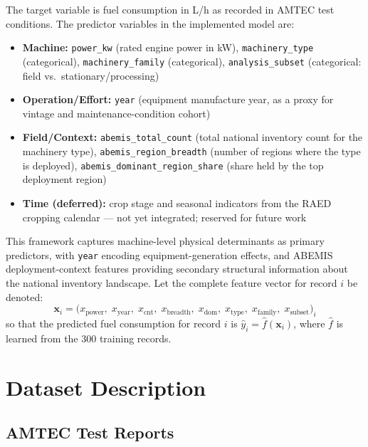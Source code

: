 \documentclass[conference]{IEEEtran}
\begin{document}
The target variable is fuel consumption in L/h as recorded in AMTEC test conditions. The predictor variables in the implemented model are:

\begin{itemize}
  \item \textbf{Machine:} \texttt{power\_kw} (rated engine power in kW), \texttt{machinery\_type} (categorical), \texttt{machinery\_family} (categorical), \texttt{analysis\_subset} (categorical: field vs.\ stationary/processing)
  \item \textbf{Operation/Effort:} \texttt{year} (equipment manufacture year, as a proxy for vintage and maintenance-condition cohort)
  \item \textbf{Field/Context:} \texttt{abemis\_total\_count} (total national inventory count for the machinery type), \texttt{abemis\_region\_breadth} (number of regions where the type is deployed), \texttt{abemis\_dominant\_region\_share} (share held by the top deployment region)
  \item \textbf{Time (deferred):} crop stage and seasonal indicators from the RAED cropping calendar --- not yet integrated; reserved for future work
\end{itemize}

This framework captures machine-level physical determinants as primary predictors, with \texttt{year} encoding equipment-generation effects, and ABEMIS deployment-context features providing secondary structural information about the national inventory landscape. Let the complete feature vector for record $i$ be denoted:
\[
\mathbf{x}_i = \bigl(x_{\text{power}},\; x_{\text{year}},\; x_{\text{cnt}},\; x_{\text{breadth}},\; x_{\text{dom}},\; x_{\text{type}},\; x_{\text{family}},\; x_{\text{subset}}\bigr)_i
\]
so that the predicted fuel consumption for record $i$ is $\hat{y}_i = \hat{f}(\mathbf{x}_i)$, where $\hat{f}$ is learned from the 300 training records.

\section{Dataset Description}

\subsection{AMTEC Test Reports}
\end{document}
